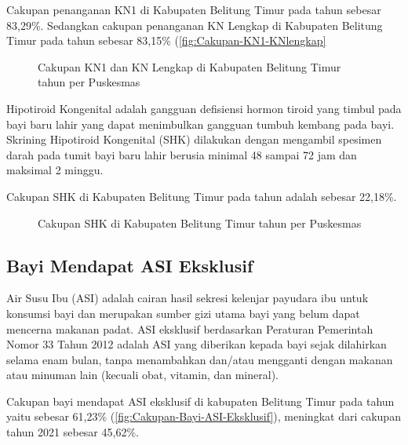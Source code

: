 Cakupan penanganan KN1 di Kabupaten Belitung Timur pada tahun \tP sebesar 83,29\%.
Sedangkan cakupan penanganan KN Lengkap di Kabupaten Belitung Timur pada tahun \tP sebesar 83,15\% (\autoref{fig:Cakupan-KN1-KNlengkap}


\begin{figure}[H]
    \centering
    \caption{Cakupan KN1 dan KN Lengkap di Kabupaten Belitung Timur tahun \tP per Puskesmas}
    \label{fig:Cakupan-KN1-KNlengkap}
\end{figure}


Hipotiroid Kongenital adalah gangguan defisiensi hormon tiroid yang timbul pada bayi baru lahir yang dapat menimbulkan gangguan tumbuh kembang pada bayi.
Skrining Hipotiroid Kongenital (SHK) dilakukan dengan mengambil spesimen darah pada tumit bayi baru lahir berusia minimal 48 sampai 72 jam dan maksimal 2 minggu.

Cakupan SHK di Kabupaten Belitung Timur pada tahun \tP adalah sebesar 22,18\%.

\begin{figure}[H]
	\centering
	\caption{Cakupan SHK di Kabupaten Belitung Timur tahun \tP per Puskesmas}
	\label{fig:Cakupan-SHK}
\end{figure}

\subsection{Bayi Mendapat ASI Eksklusif}
Air Susu Ibu (ASI) adalah cairan hasil sekresi kelenjar payudara ibu
untuk konsumsi bayi dan merupakan sumber gizi utama bayi yang belum
dapat mencerna makanan padat. ASI eksklusif berdasarkan Peraturan
Pemerintah Nomor 33 Tahun 2012 adalah ASI yang diberikan kepada bayi
sejak dilahirkan selama enam bulan, tanpa menambahkan dan/atau mengganti
dengan makanan atau minuman lain (kecuali obat, vitamin, dan mineral).

Cakupan bayi mendapat ASI eksklusif di kabupaten Belitung Timur pada
tahun \tP yaitu sebesar 61,23\% (\autoref{fig:Cakupan-Bayi-ASI-Eksklusif}), meningkat dari cakupan tahun 2021 sebesar 45,62\%.


